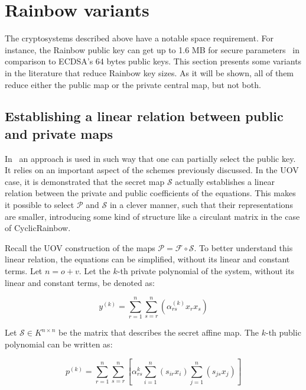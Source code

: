 \documentclass{ufsctex/ufsctex}
\begin{document}
\section{Rainbow variants}\label{sec:rainbowvariants}

The cryptosystems described above have a notable space requirement. For
instance, the Rainbow public key can get up to 1.6 MB for secure
parameters~\cite[Table 2]{ding2017nist} in comparison to ECDSA's 64 bytes
public keys. This section presents some variants in the literature that reduce
Rainbow key sizes. As it will be shown, all of them reduce either the public
map or the private central map, but not both.

\subsection{Establishing a linear relation between public and private maps}
\label{sec:relation}

In~\cite{petzoldt2010cyclicrainbow} an approach is used in such way that one
can partially select the public key. It relies on an important aspect of the
schemes previously discussed. In the UOV case, it is demonstrated that the
secret map $\mathcal{S}$ actually establishes a linear relation between the
private and public coefficients of the equations. This makes it possible to
select $\mathcal{P}$ and $\mathcal{S}$ in a clever manner, such that their
representations are smaller, introducing some kind of structure like a
circulant matrix in the case of CyclicRainbow.

Recall the UOV construction of the maps $\mathcal{P} = \mathcal{F} \circ
\mathcal{S}$. To better understand this linear relation, the equations can be
simplified, without its linear and constant terms. Let $n = o + v$. Let the
$k$-th private polynomial of the system, without its linear and constant terms,
be denoted as:

\begin{equation}
y^{(k)} = \sum_{r=1}^n \sum_{s=r}^n\left(\alpha^{(k)}_{rs}x_rx_s\right)
\end{equation}

Let $\mathcal{S} \in K^{n \times n}$ be the matrix that describes the secret
affine map. The $k$-th public polynomial can be written as:

\begin{equation}\label{eq:pubpolynomial}
p^{(k)} = \sum_{r=1}^n \sum_{s=r}^n
\left[ \alpha^{k}_{rs} \sum_{i=1}^n(s_{ir}x_i) \sum_{j=1}^n(s_{js}x_j) \right]
\end{equation}
\end{document}
